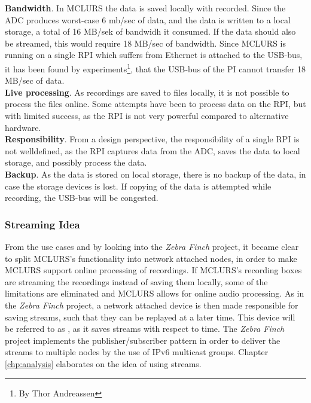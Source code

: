 \textbf{Bandwidth}. In MCLURS the data is saved locally with recorded. Since the ADC produces worst-case 6 mb/sec of data, and the data is written to a local storage, a total of 16 MB/sek of bandwidh it consumed. If the data should also be streamed, this would require 18 MB/sec of bandwidth. Since MCLURS is running on a single RPI which suffers from Ethernet is attached to the USB-bus, it has been found by experiments\footnote{By Thor Andreassen}, that the USB-bus of the PI cannot transfer 18 MB/sec of data.\\

\textbf{Live processing}. As recordings are saved to files locally, it is not possible to process the files online. Some attempts have been to process data on the RPI, but with limited success, as the RPI is not very powerful compared to alternative hardware. \\

\textbf{Responsibility}. From a design perspective, the responsibility of a single RPI is not welldefined, as the RPI captures data from the ADC, saves the data to local storage, and possibly process the data. \\

\textbf{Backup}. As the data is stored on local storage, there is no backup of the data, in case the storage devices is lost. If copying of the data is attempted while recording, the USB-bus will be congested.

 
\subsubsection{Streaming Idea} \label{sec:streamingidea}
From the use cases and by looking into the \textit{Zebra Finch}\citep{larsen2016system} project, it became clear to split MCLURS's functionality into network attached nodes, in order to make MCLURS support online processing of recordings. If MCLURS's recording boxes are streaming the recordings instead of saving them locally, some of the limitations are eliminated and MCLURS allows for online audio processing. As in the \textit{Zebra Finch} project, a network attached device is then made responsible for saving streams, such that they can be replayed at a later time. This device will be referred to as , as it saves streams with respect to time. The \textit{Zebra Finch} project implements the publisher/subscriber pattern in order to deliver the streams to multiple nodes by the use of IPv6 multicast groups. 
Chapter \ref{chp:analysis} elaborates on the idea of using streams.\\


